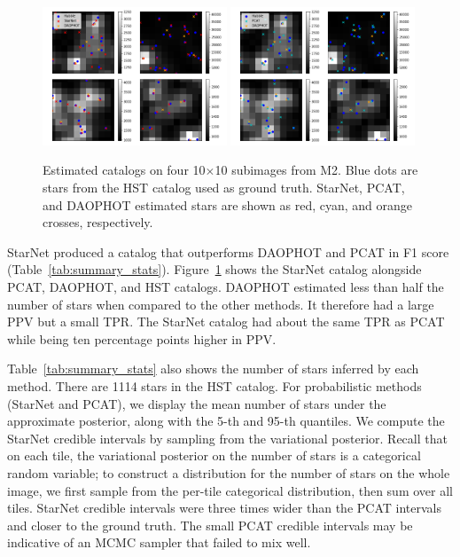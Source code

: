 \begin{figure}[tb]
    \centering
    \includegraphics[width=0.49\textwidth]{figures/m2_results/example_subimages_starnet.png}
    \includegraphics[width=0.49\textwidth]{figures/m2_results/example_subimages_pcat.png}
    \caption{Estimated catalogs on four 10$\times$10 subimages from
    M2. Blue dots are stars from the HST catalog used as ground truth.
    StarNet, PCAT, and DAOPHOT estimated stars are shown as
    red, cyan, and orange crosses, respectively. }
    \label{fig:example_subimages}
\end{figure}

StarNet produced a catalog that outperforms DAOPHOT and PCAT in F1 score (Table~\ref{tab:summary_stats}).
Figure~\ref{fig:example_subimages} shows the StarNet catalog alongside PCAT, DAOPHOT, and HST catalogs.
DAOPHOT estimated less than half the number of stars when compared to the other methods.
It therefore had a large PPV but a small TPR.
The StarNet catalog had about the same TPR as PCAT while being ten percentage points higher in PPV.

Table~\ref{tab:summary_stats} also shows the number of stars inferred by each method.
There are 1114 stars in the HST catalog.
For probabilistic methods (StarNet and PCAT),
we display the mean number of stars under the approximate posterior, along with the 5-th and 95-th quantiles.
We compute the StarNet credible intervals by sampling from the variational posterior. 
Recall that on each tile, the variational posterior on the number of stars is a categorical random variable; 
to construct a distribution for the number of stars on the whole image, we first sample from the per-tile categorical distribution, then sum over all tiles. 
StarNet credible intervals were three times wider than the PCAT intervals
and closer to the ground truth.
The small PCAT credible intervals may be indicative of an MCMC sampler that failed to mix well.

